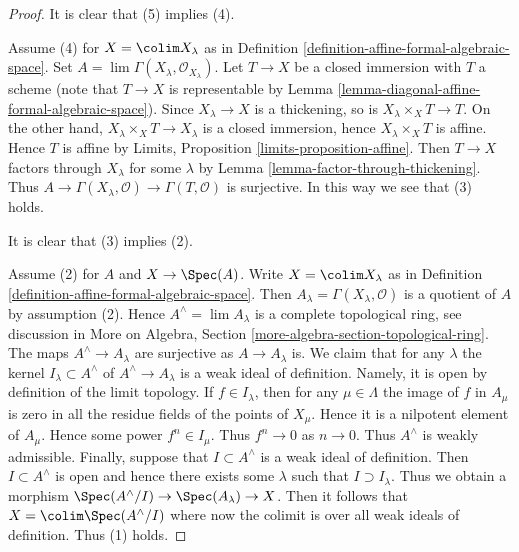 \begin{proof}
It is clear that (5) implies (4).

\medskip\noindent
Assume (4) for $X = \colim X_\lambda$ as in
Definition \ref{definition-affine-formal-algebraic-space}.
Set $A = \lim \Gamma(X_\lambda, \mathcal{O}_{X_\lambda})$.
Let $T \to X$ be a closed immersion with $T$ a scheme
(note that $T \to X$ is representable by
Lemma \ref{lemma-diagonal-affine-formal-algebraic-space}).
Since $X_\lambda \to X$ is a thickening, so is
$X_\lambda \times_X T \to T$. On the other hand,
$X_\lambda \times_X T \to X_\lambda$ is a closed immersion,
hence $X_\lambda \times_X T$ is affine. Hence $T$ is affine
by Limits, Proposition \ref{limits-proposition-affine}.
Then $T \to X$ factors through $X_\lambda$ for some $\lambda$
by Lemma \ref{lemma-factor-through-thickening}.
Thus $A \to \Gamma(X_\lambda, \mathcal{O}) \to \Gamma(T, \mathcal{O})$
is surjective. In this way we see that (3) holds.

\medskip\noindent
It is clear that (3) implies (2).

\medskip\noindent
Assume (2) for $A$ and $X \to \Spec(A)$. Write $X = \colim X_\lambda$
as in Definition \ref{definition-affine-formal-algebraic-space}.
Then $A_\lambda = \Gamma(X_\lambda, \mathcal{O})$ is a quotient
of $A$ by assumption (2). Hence $A^\wedge = \lim A_\lambda$
is a complete topological ring, see discussion in
More on Algebra, Section \ref{more-algebra-section-topological-ring}.
The maps $A^\wedge \to A_\lambda$ are surjective as $A \to A_\lambda$ is.
We claim that for any $\lambda$ the kernel $I_\lambda \subset A^\wedge$ of
$A^\wedge \to A_\lambda$ is a weak ideal of definition.
Namely, it is open by definition of the limit topology.
If $f \in I_\lambda$, then for any $\mu \in \Lambda$
the image of $f$ in $A_\mu$ is zero in all the residue fields
of the points of $X_\mu$. Hence it is a nilpotent element
of $A_\mu$. Hence some power $f^n \in I_\mu$. Thus $f^n \to 0$
as $n \to 0$. Thus $A^\wedge$ is weakly admissible.
Finally, suppose that $I \subset A^\wedge$ is a weak ideal
of definition. Then $I \subset A^\wedge$ is open and hence there exists
some $\lambda$ such that $I \supset I_\lambda$. Thus we obtain a morphism
$\Spec(A^\wedge/I) \to \Spec(A_\lambda) \to X$.
Then it follows that $X = \colim \Spec(A^\wedge/I)$ where now
the colimit is over all weak ideals of definition.
Thus (1) holds.


\end{proof}
